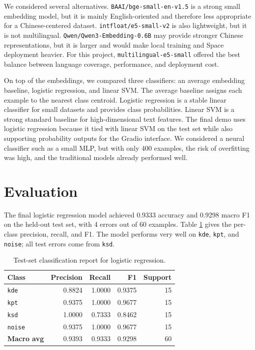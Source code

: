 \documentclass[11pt,a4paper]{article}
\begin{document}
We considered several alternatives. \texttt{BAAI/bge-small-en-v1.5} is a strong small embedding model, but it is mainly English-oriented and therefore less appropriate for a Chinese-centered dataset. \texttt{intfloat/e5-small-v2} is also lightweight, but it is not multilingual. \texttt{Qwen/Qwen3-Embedding-0.6B} may provide stronger Chinese representations, but it is larger and would make local training and Space deployment heavier. For this project, \texttt{multilingual-e5-small} offered the best balance between language coverage, performance, and deployment cost.

On top of the embeddings, we compared three classifiers: an average embedding baseline, logistic regression, and linear SVM. The average baseline assigns each example to the nearest class centroid. Logistic regression is a stable linear classifier for small datasets and provides class probabilities. Linear SVM is a strong standard baseline for high-dimensional text features. The final demo uses logistic regression because it tied with linear SVM on the test set while also supporting probability outputs for the Gradio interface. We considered a neural classifier such as a small MLP, but with only 400 examples, the risk of overfitting was high, and the traditional models already performed well.

\section{Evaluation}

The final logistic regression model achieved 0.9333 accuracy and 0.9298 macro F1 on the held-out test set, with 4 errors out of 60 examples. Table \ref{tab:perclass} gives the per-class precision, recall, and F1. The model performs very well on \texttt{kde}, \texttt{kpt}, and \texttt{noise}; all test errors come from \texttt{ksd}.

\begin{table}[h]
\centering
\small
\begin{tabular}{lrrrr}
\toprule
\textbf{Class} & \textbf{Precision} & \textbf{Recall} & \textbf{F1} & \textbf{Support} \\
\midrule
\texttt{kde} & 0.8824 & 1.0000 & 0.9375 & 15 \\
\texttt{kpt} & 0.9375 & 1.0000 & 0.9677 & 15 \\
\texttt{ksd} & 1.0000 & 0.7333 & 0.8462 & 15 \\
\texttt{noise} & 0.9375 & 1.0000 & 0.9677 & 15 \\
\midrule
\textbf{Macro avg} & 0.9393 & 0.9333 & 0.9298 & 60 \\
\bottomrule
\end{tabular}
\caption{Test-set classification report for logistic regression.}
\label{tab:perclass}
\end{table}
\end{document}
